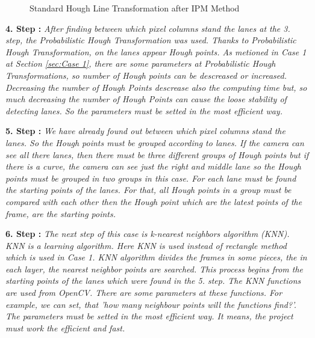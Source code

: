 \begin{figure}[H]
  \centering
  \caption{Standard Hough Line Transformation after IPM Method}
\end{figure} 



\textbf{4. Step : }\emph{\color{blue}After finding between which pixel columns stand the lanes at the 3. step, the Probabilistic Hough Transformation was used. Thanks to Probabilistic Hough Transformation, on the lanes appear Hough points. As metioned in Case 1 at Section \ref{sec:Case 1}, there are some parameters at Probabilistic Hough Transformations, so number of Hough points can be descreased or increased. Decreasing the number of Hough Points descrease also the computing time but, so much decreasing the number of Hough Points can cause the loose stability of detecting lanes. So the parameters must be setted in the most efficient way.}

\textbf{5. Step : }\emph{\color{blue}We have already found out between which pixel columns stand the lanes. So the Hough points must be grouped according to lanes. If the camera can see all there lanes, then there must be three different groups of Hough points but if there is a curve, the camera can see just the right and middle lane so the Hough points must be grouped in two groups in this case. For each lane must be found the starting points of the lanes. For that, all Hough points in a group must be compared with each other then the Hough point which are the latest points of the frame, are the starting points.}

\textbf{6. Step : }\emph{\color{blue}The next step of this case is k-nearest neighbors algorithm (KNN). KNN is a learning algorithm. Here KNN is used instead of rectangle method which is used in Case 1. KNN algorithm divides the frames in some pieces, the in each layer, the nearest neighbor points are searched. This process begins from the starting points of the lanes which were found in the 5. step. The KNN functions are used from OpenCV. There are some parameters at these functions. For example, we can set, that 'how many neighbour points will the functions find?'. The parameters must be setted in the most efficient way. It means, the project must work the efficient and fast.}

